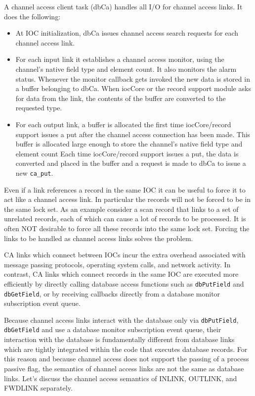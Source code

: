 A channel access client task (dbCa) handles all I/O for channel access links.
It does the following:

\begin{itemize}
\item At IOC initialization, dbCa issues channel access search requests for each channel access link.

\item For each input link it establishes a channel access monitor, using the channel's native field type and element count.
It also monitors the alarm status.
Whenever the monitor callback gets invoked the new data is stored in a buffer belonging to dbCa.
When iocCore or the record support module asks for data from the link, the contents of the buffer are converted to the requested type.

\item For each output link, a buffer is allocated the first time iocCore/record support issues a put after the channel access connection has been made.
This buffer is allocated large enough to store the channel's native field type and element count
Each time iocCore/record support issues a put, the data is converted and placed in the buffer and a request is made to dbCa to issue a new \verb|ca_put|.

\end{itemize}

Even if a link references a record in the same IOC it can be useful to force it to act like a channel access link.
In particular the records will not be forced to be in the same lock set.
As an example consider a scan record that links to a set of unrelated records, each of which can cause a lot of records to be processed.
It is often NOT desirable to force all these records into the same lock set.
Forcing the links to be handled as channel access links solves the problem.

CA links which connect between IOCs incur the extra overhead associated with message passing protocols, operating system calls, and network activity.
In contrast, CA links which connect records in the same IOC are executed more efficiently by directly calling database access functions such as \verb|dbPutField| and \verb|dbGetField|, or by receiving callbacks directly from a database monitor subscription event queue.

Because channel access links interact with the database only via \verb|dbPutField|, \verb|dbGetField| and use a database monitor subscription event queue, their interaction with the database is fundamentally different from database links which are tightly integrated within the code that executes database records.
For this reason and because channel access does not support the passing of a process passive flag, the semantics of channel access links are not the same as database links.
Let's discuss the channel access semantics of INLINK, OUTLINK, and FWDLINK separately.

